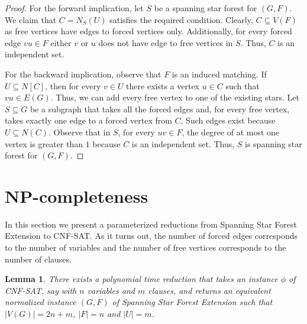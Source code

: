 \documentclass[en]{pracamgr}
\newtheorem{lemma}{Lemma}
\theoremstyle{definition}
\newcommand{\ssf}{spanning star forest}
\newcommand{\ssfep}{{\sc Spanning Star Forest Extension}}
\newcommand{\cnfsat}{{\sc CNF-SAT}}
\begin{document}
\begin{proof}
	For the forward implication, let $S$ be a \ssf{} for $(G,F)$. We claim that $C = N_S(U)$ satisfies the required condition. Clearly, $C \subseteq V(F)$ as free vertices have edges to forced vertices only. Additionally, for every forced edge $vu \in F$ either $v$ or $u$ does not have edge to free vertices in $S$. Thus, $C$ is an independent set. 
	
	For the backward implication, observe that $F$ is an induced matching. If $U \subseteq N[C]$, then for every $v \in U$ there exists a vertex $u \in C$ such that $vu \in E(G)$. Thus, we can add every free vertex to one of the existing stars. Let $S \subseteq G$ be a subgraph that takes all the forced edges and, for every free vertex, takes exactly one edge to a forced vertex from $C$. Such edges exist because $U \subseteq N(C)$. Observe that in $S$, for every $uv \in F$, the degree of at most one vertex is greater than $1$ because $C$ is an independent set. Thus, $S$ is spanning star forest for $(G,F)$.
\end{proof}



\section{NP-completeness}

In this section we present a parameterized reductions from \ssfep{} to \cnfsat{}. As it turns out, the number of forced edges corresponds to the number of variables and the number of free vertices corresponds to the number of clauses.

\begin{lemma}\label{ssfep reduction}
	There exists a polynomial time reduction that takes an instance $\phi$ of \cnfsat{}, say with $n$ variables and $m$ clauses, and returns an equivalent normalized instance $(G,F)$ of \ssfep{} such that $|V(G)|=2n+m$, $|F|=n$ and $|U|=m$.
\end{lemma}
\end{document}

